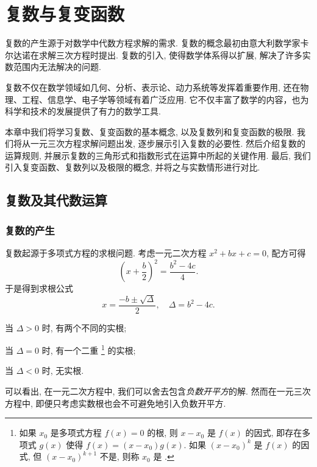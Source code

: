 
\chapter{复数与复变函数}
\label{chapter:1}

\begin{introduction}
  复数的产生源于对数学中代数方程求解的需求.
  复数的概念最初由意大利数学家卡尔达诺在求解三次方程时提出.
  复数的引入, 使得数学体系得以扩展, 解决了许多实数范围内无法解决的问题.
  
  复数不仅在数学领域如几何、分析、表示论、动力系统等发挥着重要作用, 还在物理、工程、信息学、电子学等领域有着广泛应用.
  它不仅丰富了数学的内容，也为科学和技术的发展提供了有力的数学工具.

  本章中我们将学习复数、复变函数的基本概念, 以及复数列和复变函数的极限.
  我们将从一元三次方程求解问题出发, 逐步展示引入复数的必要性. 然后介绍复数的运算规则, 并展示复数的三角形式和指数形式在运算中所起的关键作用. 最后, 我们引入复变函数、复数列以及极限的概念, 并将之与实数情形进行对比.
\end{introduction}


\section{复数及其代数运算}

\subsection{复数的产生}

复数起源于多项式方程的求根问题. 
考虑一元二次方程 $x^2+bx+c=0$, 配方可得
  \[\left(x+\frac b2\right)^2=\frac{b^2-4c}4.\]
于是得到求根公式
  \[x=\frac{-b\pm\sqrt\Delta}2,\quad \Delta=b^2-4c.\]
\begin{enumpar}
  \item 当 $\Delta>0$ 时, 有两个不同的实根;
  \item 当 $\Delta=0$ 时, 有一个二重%
    \footnote{%
      如果 $x_0$ 是多项式方程 $f(x)=0$ 的根, 则 $x-x_0$ 是 $f(x)$ 的因式, 即存在多项式 $g(x)$ 使得 $f(x)=(x-x_0)g(x)$.
      如果 $(x-x_0)^k$ 是 $f(x)$ 的因式, 但 $(x-x_0)^{k+1}$ 不是, 则称 $x_0$ 是 .
    }%
    的实根;
  \item 当 $\Delta<0$ 时, 无实根.
\end{enumpar}

可以看出, 在一元二次方程中, 我们可以舍去包含\emph{负数开平方}的解. 然而在一元三次方程中, 即便只考虑实数根也会不可避免地引入负数开平方.

